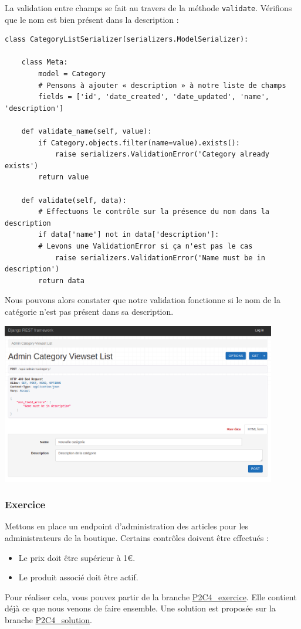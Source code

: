\documentclass[a4paper]{article}
\begin{document}
La validation entre champs se fait au travers de la méthode {\tt validate}. Vérifions que le nom est bien présent dans la description :


\begin{verbatim}
class CategoryListSerializer(serializers.ModelSerializer):
 
    class Meta:
        model = Category
        # Pensons à ajouter « description » à notre liste de champs
        fields = ['id', 'date_created', 'date_updated', 'name', 'description']
 
    def validate_name(self, value):
        if Category.objects.filter(name=value).exists():
            raise serializers.ValidationError('Category already exists')
        return value
 
    def validate(self, data):
        # Effectuons le contrôle sur la présence du nom dans la description
        if data['name'] not in data['description']:
        # Levons une ValidationError si ça n'est pas le cas
            raise serializers.ValidationError('Name must be in description')
        return data
\end{verbatim}
Nous pouvons alors constater que notre validation fonctionne si le nom de la catégorie n’est pas présent dans sa description.
\begin{center}
\includegraphics[width=12cm]{images/image22.png}
\end{center}

\subsubsection*{Exercice}
Mettons en place un endpoint d’administration des articles pour les administrateurs de la boutique. Certains contrôles doivent être effectués :
\begin{itemize}
\item Le {\color{monOrange}prix} doit être supérieur à 1€.
\item Le produit associé doit être {\color{monOrange}actif}.
\end{itemize}
Pour réaliser cela, vous pouvez partir de la branche \href{https://github.com/OpenClassrooms-Student-Center/7192416\_APIs\_DRF/tree/P2C4\_exercice}{P2C4\_exercice}. Elle contient déjà ce que nous venons de faire ensemble. Une solution est proposée sur la branche \href{https://github.com/OpenClassrooms-Student-Center/7192416\_APIs\_DRF/tree/P2C4\_solution}{P2C4\_solution}.
\end{document}

